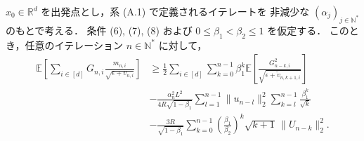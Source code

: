 \documentclass[dvipdfmx,a4paper,11pt]{jsarticle}
\begin{document}
\begin{lemma}[A.1 (モメンタム付き適応的更新は下降方向にほぼ沿う)]
\label{lemma:A1}
$x_0 \in \mathbb{R}^d$ を出発点とし，系 (A.1) で定義されるイテレートを
非減少な $(\alpha_j)_{j \in \mathbb{N}^*}$ のもとで考える．
条件 (6), (7), (8) および $0 \leq \beta_1 < \beta_2 \leq 1$ を仮定する．
このとき，任意のイテレーション $n \in \mathbb{N}^*$ に対して，
\begin{equation}
    \begin{aligned}
        \mathbb{E}\!\left[\sum_{i \in [d]} G_{n,i} \frac{m_{n,i}}{\sqrt{\epsilon + v_{n,i}}}\right] &\geq\frac{1}{2} \sum_{i \in [d]} \sum_{k=0}^{n-1} \beta_1^k
        \mathbb{E}\!\left[\frac{G_{n-k,i}^2}{\sqrt{\epsilon + \tilde{v}_{n,k+1,i}}}\right] \\
        &- \frac{\alpha_n^2 L^2}{4R\sqrt{1-\beta_1}}
          \sum_{l=1}^{n-1} \|u_{n-l}\|_2^2 \sum_{k=l}^{n-1} \frac{\beta_1^k}{\sqrt{k}} \\
        &- \frac{3R}{\sqrt{1-\beta_1}}
          \sum_{k=0}^{n-1} \left(\frac{\beta_1}{\beta_2}\right)^k \sqrt{k+1}\,\|U_{n-k}\|_2^2.
    \end{aligned}
    \label{eq:lemmaA1}
\end{equation}
\end{lemma}
\end{document}
